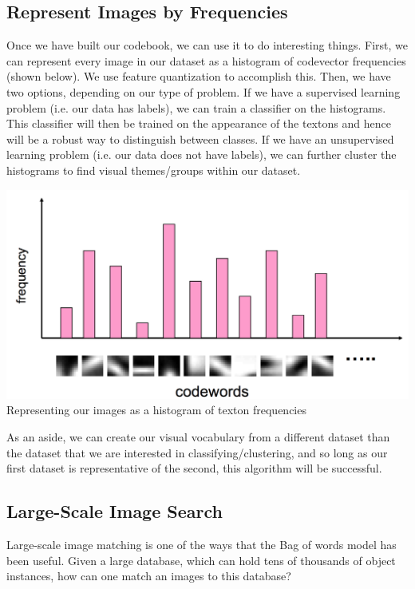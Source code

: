 \documentclass{article}
\begin{document}
\subsection{Represent Images by Frequencies}
Once we have built our codebook, we can use it to do interesting things. First, we can represent every image in our dataset as a histogram of codevector frequencies (shown below). We use feature quantization to accomplish this. Then, we have two options, depending on our type of problem. If we have a supervised learning problem (i.e. our data has labels), we can train a classifier on the histograms. This classifier will then be trained on the appearance of the textons and hence will be a robust way to distinguish between classes. If we have an unsupervised learning problem (i.e. our data does not have labels), we can further cluster the histograms to find visual themes/groups within our dataset. 
\begin{center}
\includegraphics[scale=0.4]{hist.png}\\
Representing our images as a histogram of texton frequencies \cite{slides}
\end{center}

As an aside, we can create our visual vocabulary from a different dataset than the dataset that we are interested in classifying/clustering, and so long as our first dataset is representative of the second, this algorithm will be successful.

\subsection{Large-Scale Image Search}
Large-scale image matching is one of the ways that the Bag of words model has been useful. Given a large database, which can hold tens of thousands of object instances, how can one match an images to this database?
\end{document}
